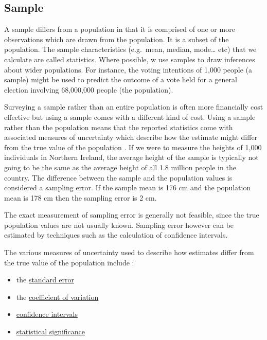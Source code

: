 \documentclass[
]{book}
\begin{document}
\hypertarget{sample}{%
\subsection{Sample}\label{sample}}

A sample differs from a population in that it is comprised of one or more observations which are drawn from the population. It is a subset of the population. The sample characteristics (e.g.~mean, median, mode\ldots{} etc) that we calculate are called statistics. Where possible, w use samples to draw inferences about wider populations. For instance, the voting intentions of 1,000 people (a sample) might be used to predict the outcome of a vote held for a general election involving 68,000,000 people (the population).

Surveying a sample rather than an entire population is often more financially cost effective but using a sample comes with a different kind of cost. Using a sample rather than the population means that the reported statistics come with associated measures of uncertainty which describe how the estimate might differ from the true value of the population \citep{uncertainty}. If we were to measure the heights of 1,000 individuals in Northern Ireland, the average height of the sample is typically not going to be the same as the average height of all 1.8 million people in the country. The difference between the sample and the population values is considered a sampling error. If the sample mean is 176 cm and the population mean is 178 cm then the sampling error is 2 cm.

The exact measurement of sampling error is generally not feasible, since the true population values are not usually known. Sampling error however can be estimated by techniques such as the calculation of confidence intervals.

The various measures of uncertainty used to describe how estimates differ from the true value of the population include \citep{uncertainty}:

\begin{itemize}
\item
  the \protect\hyperlink{stderr}{standard error}
\item
  the \protect\hyperlink{coeff}{coefficient of variation}
\item
  \protect\hyperlink{confint}{confidence intervals}
\item
  \protect\hyperlink{signif}{statistical significance}
\end{itemize}
\end{document}
